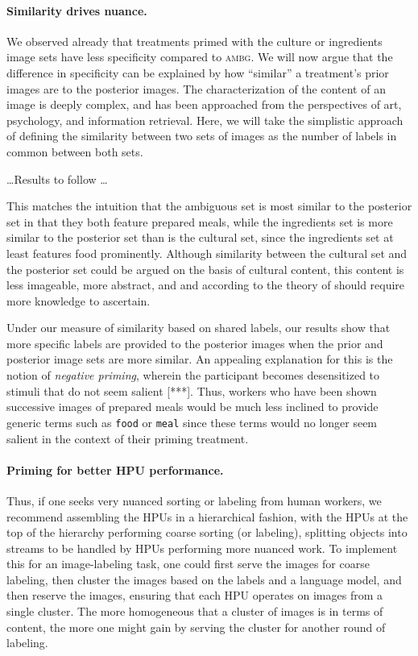 \documentclass[a4paper]{report}
\begin{document}
\paragraph{Similarity drives nuance.}
We observed already that treatments primed with the 
culture or ingredients image sets have less specificity compared to 
\textsc{ambg}.  We will now argue that the difference in specificity
can be explained by how ``similar'' a treatment's prior 
images are to the posterior images. The characterization of the content of an 
image is deeply complex, and has been approached from the perspectives of art\cite{panofsky1939studies,shatford1986analyzing},
psychology\cite{Tversky1977327}, and information retrieval\cite{Jaimes20002}.  Here, we will take the simplistic 
approach of defining the similarity between two sets of images as the number of
labels in common between both sets.

\dots Results to follow \dots

This matches the intuition that the ambiguous set is most similar to the 
posterior set in that they both feature prepared meals, while the ingredients
set is more similar to the posterior set than is the cultural set, since the
ingredients set at least features food prominently.  Although similarity 
between the cultural set and the posterior set could be argued on the basis
of cultural content, this content is less imageable, more abstract, and
and according to the theory of \cite{Jaimes20002} should require more 
knowledge to ascertain.

Under our measure of similarity based on shared labels, our results show that
more specific labels are provided to the posterior images when the prior and
posterior image sets are more similar.
An appealing explanation for 
this is the notion of \textit{negative priming}, wherein the participant
becomes desensitized to stimuli that do not seem salient [***].  Thus, workers 
who have been shown successive images of prepared meals 
would be much less inclined to provide generic terms such as \texttt{food} or 
\texttt{meal} since these terms would no longer seem salient in the 
context of their priming treatment.  

\paragraph{Priming for better HPU performance.}
Thus, if one seeks very nuanced sorting or labeling from human workers, 
we recommend assembling the HPUs in a hierarchical fashion, with the 
HPUs at the top of the hierarchy performing coarse sorting (or labeling), 
splitting objects into streams to be handled by HPUs performing more nuanced 
work.  To implement this for an
image-labeling task, one could first serve the images for coarse labeling,
then cluster the images based on the labels and a language model, and then 
reserve the images, ensuring that each HPU operates on images from a single 
cluster.  The more homogeneous that a cluster of images is in terms of 
content, the more one might gain by serving the cluster for another round of
labeling.
\end{document}
